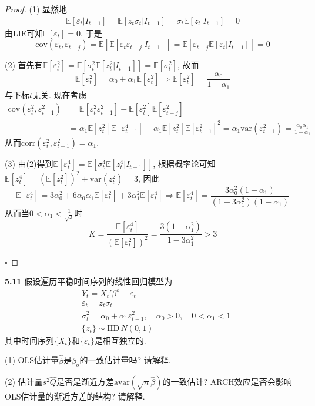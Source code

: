 \documentclass[cn,12pt,math=mtpro2,citestyle=gb7714-2015,bibstyle=gb7714-2015,twocol,mode=simple]{elegantbook}
\newcommand{\E}{\mathbb{E}}
\newcommand{\var}{\text{var}}
\begin{document}
\begin{proof}
  (1) 显然地
  \begin{align*}
  \E[\varepsilon_t|I_{t-1}]=\E[z_t\sigma_t|I_{t-1}]=\sigma_t\E[z_t|I_{t-1}]=0
  \end{align*}
  由LIE可知$\E[\varepsilon_t]=0$. 于是
  $$\text{cov}(\varepsilon_t,\varepsilon_{t-j})=\E[\E[\varepsilon_t\varepsilon_{t-j}|I_{t-1}]]=\E[\varepsilon_{t-j}\E[\varepsilon_t|I_{t-1}]]=0$$

  (2) 首先有$\E[\varepsilon_t^2]=\E[\sigma_t^2\E[z_t^2|I_{t-1}]]=\E[\sigma^2_t]$, 故而
  $$\E[\varepsilon_t^2]=\alpha_0+\alpha_1\E[\varepsilon_t^2]\Rightarrow \E[\varepsilon_t^2]=\frac{\alpha_0}{1-\alpha_1}$$
  与下标$t$无关. 现在考虑
   \begin{align*}
  \text{cov}(\varepsilon_t^2,\varepsilon_{t-1}^2)&=\E[\varepsilon_t^2\varepsilon_{t-1}^2]-\E[\varepsilon_t^2]\E[\varepsilon_{t-j}^2] \\
  &=\alpha_1\E[z_t^2]\E[\varepsilon_{t-1}^4]-\alpha_1\E[z_t^2]\E[\varepsilon_{t-1}^2]^2 =\alpha_1\text{var}(\varepsilon_{t-1}^2)=\frac{\alpha_0\alpha_1}{1-\alpha_1}
  \end{align*}
  从而$\text{corr}(\varepsilon_t^2,\varepsilon_{t-1}^2)=\alpha_1$.

  (3) 由(2)得到$\E[\varepsilon_t^4]=\E[\sigma_t^4\E[z_t^4|I_{t-1}]]$, 根据概率论可知$\E[z_t^4]=(\E[z_t^2])^2+\var(z_t^2)=3$, 因此
  $$\E[\varepsilon_t^4]=3\alpha_0^2+6\alpha_0\alpha_1\E[\varepsilon_t^2]+3\alpha_1^2\E[\varepsilon_t^4]\Rightarrow\E[\varepsilon_t^4]=\frac{3\alpha_0^2(1+\alpha_1)}{(1-3\alpha_1^2)(1-\alpha_1)}$$
  从而当$\displaystyle0<\alpha_1<\frac{1}{\sqrt{3}}$时
  $$K=\frac{\E[\varepsilon_t^4]}{(\E[\varepsilon_t^2])^2}=\frac{3(1-\alpha_1^2)}{1-3\alpha_1^2}>3$$

  $\square$
\end{proof}

\textbf{5.11} 假设遍历平稳时间序列的线性回归模型为
\begin{align*}
& Y_t=X_t'\beta^o+\varepsilon_t \\
& \varepsilon_t=z_t\sigma_t \\
& \sigma_t^2=\alpha_0+\alpha_1\varepsilon_{t-1}^2,\quad \alpha_0>0,\quad 0<\alpha_1<1 \\
& \{z_t\}\sim\text{IID}\, N(0,1)
\end{align*}
其中时间序列$\{X_t\}$和$\{\varepsilon_t\}$是相互独立的.

(1) OLS估计量$\hat{\beta}$是$\beta_o$的一致估计量吗? 请解释.

(2) 估计量$s^2\hat{Q}$是否是渐近方差$\text{avar}(\sqrt{n}\hat{\beta})$的一致估计? ARCH效应是否会影响OLS估计量的渐近方差的结构? 请解释.
\end{document}
